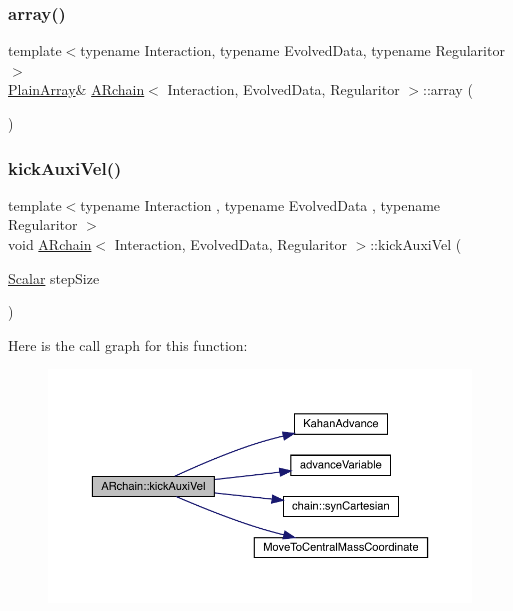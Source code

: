 \mbox{\label{class_a_rchain_aeb4d9b0a28ae3b4e4286edf838e5a905}} 
\subsubsection{\texorpdfstring{array()}{array()}}
{\footnotesize\ttfamily template$<$typename Interaction, typename Evolved\+Data, typename Regularitor$>$ \\
\mbox{\hyperlink{class_a_rchain_a829aca51411c08ffd518294770a374d5}{Plain\+Array}}\& \mbox{\hyperlink{class_a_rchain}{A\+Rchain}}$<$ Interaction, Evolved\+Data, Regularitor $>$\+::array (\begin{DoxyParamCaption}{ }\end{DoxyParamCaption})\hspace{0.3cm}{\ttfamily [inline]}}

\mbox{\label{class_a_rchain_a53838a7890cee54c69786bda87dd6cd9}} 
\subsubsection{\texorpdfstring{kick\+Auxi\+Vel()}{kickAuxiVel()}}
{\footnotesize\ttfamily template$<$typename Interaction , typename Evolved\+Data , typename Regularitor $>$ \\
void \mbox{\hyperlink{class_a_rchain}{A\+Rchain}}$<$ Interaction, Evolved\+Data, Regularitor $>$\+::kick\+Auxi\+Vel (\begin{DoxyParamCaption}\item[{\mbox{\hyperlink{class_a_rchain_a707e42a79e4744424a34c9007e84ee07}{Scalar}}}]{step\+Size }\end{DoxyParamCaption})\hspace{0.3cm}{\ttfamily [private]}}

Here is the call graph for this function\+:
\nopagebreak
\begin{figure}[H]
\begin{center}
\leavevmode
\includegraphics[width=350pt]{class_a_rchain_a53838a7890cee54c69786bda87dd6cd9_cgraph}
\end{center}
\end{figure}
\mbox{\label{class_a_rchain_a0b073cd82321047d7fafda59cef998ef}} 
